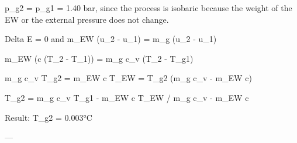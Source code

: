 p_g2 = p_g1 = 1.40 bar, since the process is isobaric because the weight of the EW or the external pressure does not change.  

Delta E = 0 and m_EW (u_2 - u_1) = m_g (u_2 - u_1)  

m_EW (c (T_2 - T_1)) = m_g c_v (T_2 - T_g1)  

m_g c_v T_g2 = m_EW c T_EW = T_g2 (m_g c_v - m_EW c)  

T_g2 = m_g c_v T_g1 - m_EW c T_EW / m_g c_v - m_EW c  

Result: T_g2 = 0.003°C  

---